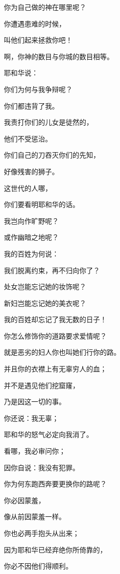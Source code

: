 {\par }{\Q {}你为自己做的神在哪里呢？
\par }{\Q 你遭遇患难的时候，
\par }{\Q 叫他们起来拯救你吧！
\par }{啊，你神的数目与你城的数目相等。
\par }{\BB \par }{\Q {}耶和华说：
\par }{\Q 你们为何与我争辩呢？
\par }{\Q 你们都违背了我。
\par }{\Q {}我责打你们的儿女是徒然的，
\par }{\Q 他们不受惩治。
\par }{\Q 你们自己的刀吞灭你们的先知，
\par }{\Q 好像残害的狮子。
\par }{\Q {}这世代的人哪，
\par }{\Q 你们要看明耶和华的话。
\par }{\Q 我岂向{}作旷野呢？
\par }{\Q 或作幽暗之地呢？
\par }{\Q 我的百姓为何说：
\par }{\Q 我们脱离约束，再不归向你了？
\par }{\Q {}处女岂能忘记她的妆饰呢？
\par }{\Q 新妇岂能忘记她的美衣呢？
\par }{\Q 我的百姓却忘记了我无数的日子！
\par }{\BB \par }{\Q {}你怎么修饰你的道路要求爱情呢？
\par }{\Q 就是恶劣的妇人你也叫她们行你的路。
\par }{\Q {}并且你的衣襟上有无辜穷人的血；
\par }{并不是遇见他们挖窟窿，
\par }{\Q 乃是因这一切的事。
\par }{\Q {}你还说：我无辜；
\par }{\Q 耶和华的怒气必定向我消了。
\par }{\Q 看哪，我必审问你；
\par }{\Q 因你自说：我没有犯罪。
\par }{\Q {}你为何东跑西奔要更换你的路呢？
\par }{\Q 你必因{}蒙羞，
\par }{\Q 像从前因{}蒙羞一样。
\par }{\Q {}你也必两手抱头从{}出来；
\par }{\Q 因为耶和华已经弃绝你所倚靠的，
\par }{\Q 你必不因他们得顺利。

}

